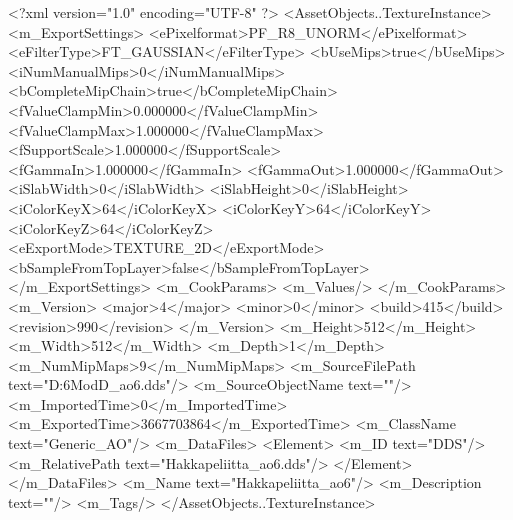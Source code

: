 <?xml version="1.0" encoding="UTF-8" ?>
<AssetObjects..TextureInstance>
	<m_ExportSettings>
		<ePixelformat>PF_R8_UNORM</ePixelformat>
		<eFilterType>FT_GAUSSIAN</eFilterType>
		<bUseMips>true</bUseMips>
		<iNumManualMips>0</iNumManualMips>
		<bCompleteMipChain>true</bCompleteMipChain>
		<fValueClampMin>0.000000</fValueClampMin>
		<fValueClampMax>1.000000</fValueClampMax>
		<fSupportScale>1.000000</fSupportScale>
		<fGammaIn>1.000000</fGammaIn>
		<fGammaOut>1.000000</fGammaOut>
		<iSlabWidth>0</iSlabWidth>
		<iSlabHeight>0</iSlabHeight>
		<iColorKeyX>64</iColorKeyX>
		<iColorKeyY>64</iColorKeyY>
		<iColorKeyZ>64</iColorKeyZ>
		<eExportMode>TEXTURE_2D</eExportMode>
		<bSampleFromTopLayer>false</bSampleFromTopLayer>
	</m_ExportSettings>
	<m_CookParams>
		<m_Values/>
	</m_CookParams>
	<m_Version>
		<major>4</major>
		<minor>0</minor>
		<build>415</build>
		<revision>990</revision>
	</m_Version>
	<m_Height>512</m_Height>
	<m_Width>512</m_Width>
	<m_Depth>1</m_Depth>
	<m_NumMipMaps>9</m_NumMipMaps>
	<m_SourceFilePath text="D:\Civ6Mod\3D\Hakkapeliitta\Hakkapeliitta_ao6.dds"/>
	<m_SourceObjectName text=""/>
	<m_ImportedTime>0</m_ImportedTime>
	<m_ExportedTime>3667703864</m_ExportedTime>
	<m_ClassName text="Generic_AO"/>
	<m_DataFiles>
		<Element>
			<m_ID text="DDS"/>
			<m_RelativePath text="Hakkapeliitta_ao6.dds"/>
		</Element>
	</m_DataFiles>
	<m_Name text="Hakkapeliitta_ao6"/>
	<m_Description text=""/>
	<m_Tags/>
</AssetObjects..TextureInstance>

